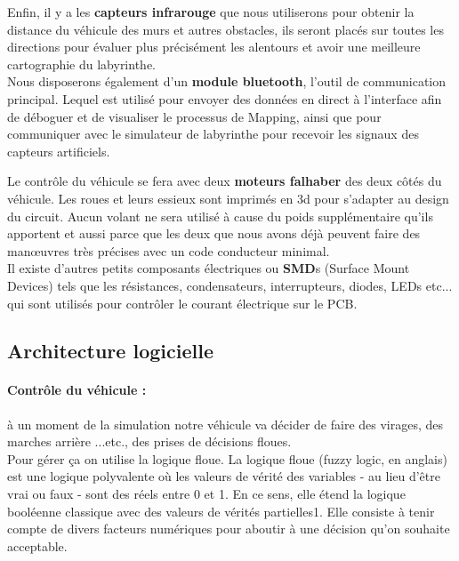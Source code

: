    Enfin, il y a les \textbf{capteurs infrarouge} que nous utiliserons pour
obtenir la distance du véhicule des murs et autres obstacles, ils seront
placés sur toutes les directions pour évaluer plus précisément les alentours
et avoir une meilleure cartographie du labyrinthe. \\


   Nous disposerons également d'un \textbf{module bluetooth}, l'outil de
communication principal.  Lequel est utilisé pour envoyer des données en
direct à l'interface afin de déboguer et de visualiser le processus de
Mapping, ainsi que pour communiquer avec le simulateur de labyrinthe pour
recevoir les signaux des capteurs artificiels. \\




   Le contrôle du véhicule se fera avec deux \textbf{moteurs falhaber}
\cite{faulhaber:1} des deux côtés du véhicule. Les roues et leurs essieux sont
imprimés en 3d pour s'adapter au design du circuit. Aucun volant ne sera
utilisé à cause du poids supplémentaire qu'ils apportent et aussi parce que
les deux que nous avons déjà peuvent faire des manœuvres très précises avec un
code conducteur minimal. \\


   Il existe d'autres petits composants électriques ou \textbf{SMD}s (Surface
Mount Devices) tels que les résistances, condensateurs, interrupteurs,
diodes, LEDs etc... qui sont utilisés pour contrôler le courant électrique
sur le PCB.

\subsection{Architecture logicielle} \label{sec:vueLogicielle}

\paragraph{Contrôle du véhicule :}à un moment de la simulation notre véhicule 
va décider de faire des virages, des marches arrière ...etc., des prises de 
décisions floues. \\

   Pour gérer ça on utilise la logique floue. La logique floue (fuzzy logic, en anglais) 
est une logique polyvalente où les valeurs de vérité des variables - au lieu d'être 
vrai ou faux - sont des réels entre 0 et 1. En ce sens, elle étend la logique booléenne 
classique avec des valeurs de vérités partielles1. Elle consiste à tenir compte de divers 
facteurs numériques pour aboutir à une décision qu'on souhaite acceptable. \\

